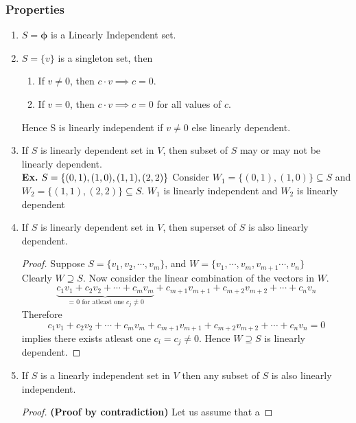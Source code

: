 \documentclass[a4paper, titlepage]{article}
\begin{document}
    \subsubsection{Properties}
    \begin{enumerate}
        \item $S = \bm{\phi}$ is a Linearly Independent set.
        \item $S = \{ v \}$ is a singleton set, then 
        \begin{enumerate}
            \item If $v \neq 0$, then $c\cdot v \implies c = 0$.
            \item If $v = 0$, then $c\cdot v \implies c = 0$ for 
            all values of $c$.
        \end{enumerate}
        Hence S is linearly independent if $v \neq 0$ else linearly
        dependent.
        \item If $S$ is linearly dependent set in $V$, then subset of $S$
        may or may not be linearly dependent. \\
        \textbf{Ex. }$S = \{ (0,1), (1,0), (1, 1), (2, 2) \} \hfill \\$
        Consider $W_1 = \{ (0,1), (1,0) \} \subseteq S$ and $W_2 = \{ (1,1), (2,2) \} \subseteq S$.
        $W_1$ is linearly independent and $W_2$ is linearly dependent
        \item If $S$ is linearly dependent set in $V$, then superset
        of $S$ is also linearly dependent.
        \begin{proof}
            Suppose $S = \{ v_1, v_2, \cdots, v_m \}$, and 
            $W = \{ v_1, \cdots, v_m, v_{m+1} \cdots, v_n \}$ \\
            Clearly $W \supseteq S$. Now consider the linear combination
            of the vectors in $W$.
            \[ \underbrace{c_1v_1 + c_2v_2 + \cdots + c_mv_m}_{\text{ = 0 for atleast one $c_j \neq 0$}} + c_{m+1}v_{m+1} + c_{m+2}v_{m+2} +\cdots + c_nv_n  \]
            Therefore
            \[ c_1v_1 + c_2v_2 + \cdots + c_mv_m + c_{m+1}v_{m+1} + c_{m+2}v_{m+2} +\cdots + c_nv_n = 0 \]
            implies there exists atleast one $c_i = c_j \neq 0$.
            Hence $W \supseteq S$ is linearly dependent.
        \end{proof}
        \item If $S$ is a linearly independent set in $V$ then any
        subset of $S$ is also linearly independent.
        \begin{proof}
            \textbf{(Proof by contradiction)} Let us assume that a

\end{proof}
\end{enumerate}
\end{document}
